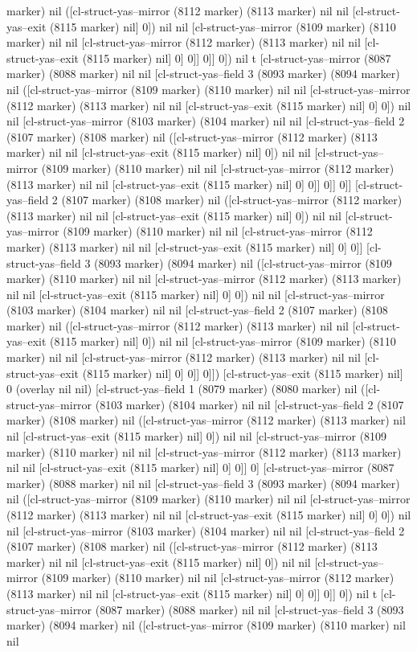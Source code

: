 marker) nil ([cl-struct-yas--mirror (8112 marker) (8113 marker) nil nil [cl-struct-yas--exit (8115 marker) nil] 0]) nil nil [cl-struct-yas--mirror (8109 marker) (8110 marker) nil nil [cl-struct-yas--mirror (8112 marker) (8113 marker) nil nil [cl-struct-yas--exit (8115 marker) nil] 0] 0]] 0]] 0]) nil t [cl-struct-yas--mirror (8087 marker) (8088 marker) nil nil [cl-struct-yas--field 3 (8093 marker) (8094 marker) nil ([cl-struct-yas--mirror (8109 marker) (8110 marker) nil nil [cl-struct-yas--mirror (8112 marker) (8113 marker) nil nil [cl-struct-yas--exit (8115 marker) nil] 0] 0]) nil nil [cl-struct-yas--mirror (8103 marker) (8104 marker) nil nil [cl-struct-yas--field 2 (8107 marker) (8108 marker) nil ([cl-struct-yas--mirror (8112 marker) (8113 marker) nil nil [cl-struct-yas--exit (8115 marker) nil] 0]) nil nil [cl-struct-yas--mirror (8109 marker) (8110 marker) nil nil [cl-struct-yas--mirror (8112 marker) (8113 marker) nil nil [cl-struct-yas--exit (8115 marker) nil] 0] 0]] 0]] 0]] [cl-struct-yas--field 2 (8107 marker) (8108 marker) nil ([cl-struct-yas--mirror (8112 marker) (8113 marker) nil nil [cl-struct-yas--exit (8115 marker) nil] 0]) nil nil [cl-struct-yas--mirror (8109 marker) (8110 marker) nil nil [cl-struct-yas--mirror (8112 marker) (8113 marker) nil nil [cl-struct-yas--exit (8115 marker) nil] 0] 0]] [cl-struct-yas--field 3 (8093 marker) (8094 marker) nil ([cl-struct-yas--mirror (8109 marker) (8110 marker) nil nil [cl-struct-yas--mirror (8112 marker) (8113 marker) nil nil [cl-struct-yas--exit (8115 marker) nil] 0] 0]) nil nil [cl-struct-yas--mirror (8103 marker) (8104 marker) nil nil [cl-struct-yas--field 2 (8107 marker) (8108 marker) nil ([cl-struct-yas--mirror (8112 marker) (8113 marker) nil nil [cl-struct-yas--exit (8115 marker) nil] 0]) nil nil [cl-struct-yas--mirror (8109 marker) (8110 marker) nil nil [cl-struct-yas--mirror (8112 marker) (8113 marker) nil nil [cl-struct-yas--exit (8115 marker) nil] 0] 0]] 0]]) [cl-struct-yas--exit (8115 marker) nil] 0 (overlay nil nil) [cl-struct-yas--field 1 (8079 marker) (8080 marker) nil ([cl-struct-yas--mirror (8103 marker) (8104 marker) nil nil [cl-struct-yas--field 2 (8107 marker) (8108 marker) nil ([cl-struct-yas--mirror (8112 marker) (8113 marker) nil nil [cl-struct-yas--exit (8115 marker) nil] 0]) nil nil [cl-struct-yas--mirror (8109 marker) (8110 marker) nil nil [cl-struct-yas--mirror (8112 marker) (8113 marker) nil nil [cl-struct-yas--exit (8115 marker) nil] 0] 0]] 0] [cl-struct-yas--mirror (8087 marker) (8088 marker) nil nil [cl-struct-yas--field 3 (8093 marker) (8094 marker) nil ([cl-struct-yas--mirror (8109 marker) (8110 marker) nil nil [cl-struct-yas--mirror (8112 marker) (8113 marker) nil nil [cl-struct-yas--exit (8115 marker) nil] 0] 0]) nil nil [cl-struct-yas--mirror (8103 marker) (8104 marker) nil nil [cl-struct-yas--field 2 (8107 marker) (8108 marker) nil ([cl-struct-yas--mirror (8112 marker) (8113 marker) nil nil [cl-struct-yas--exit (8115 marker) nil] 0]) nil nil [cl-struct-yas--mirror (8109 marker) (8110 marker) nil nil [cl-struct-yas--mirror (8112 marker) (8113 marker) nil nil [cl-struct-yas--exit (8115 marker) nil] 0] 0]] 0]] 0]) nil t [cl-struct-yas--mirror (8087 marker) (8088 marker) nil nil [cl-struct-yas--field 3 (8093 marker) (8094 marker) nil ([cl-struct-yas--mirror (8109 marker) (8110 marker) nil nil 